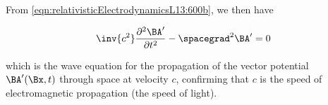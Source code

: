 From \ref{eqn:relativisticElectrodynamicsL13:600b}, we then have

\begin{equation}\label{eqn:relativisticElectrodynamicsL13:610}
\inv{c^2} \frac{\partial^2 \BA'}{\partial t^2} -\spacegrad^2 \BA' = 0
\end{equation}

which is the wave equation for the propagation of the vector potential $\BA'(\Bx, t)$ through space at velocity $c$, confirming that $c$ is the speed of electromagnetic propagation (the speed of light).

\EndArticle
